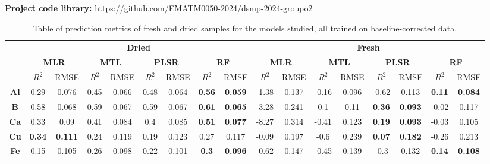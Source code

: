\documentclass[conference]{IEEEtran}
\begin{document}
\vspace{0.1cm}
\noindent \textbf{Project code library:} \url{https://github.com/EMATM0050-2024/dsmp-2024-groupo2}




\clearpage
\onecolumn

\appendix

\begin{table}[htbp]
\caption{Table of prediction metrics of fresh and dried samples for the models studied, all trained on baseline-corrected data.}
\begin{center}

\begin{tabular}{|c|c|c|c|c|c|c|c|c||c|c|c|c|c|c|c|c|}
\cline{2-17}
\multicolumn{1}{c|}{ }& \multicolumn{8}{|c||}{\textbf{Dried}}& \multicolumn{8}{|c|}{\textbf{Fresh}} \\
\cline{2-17}
\multicolumn{1}{c|}{ }& \multicolumn{2}{|c|}{\textbf{MLR}} & \multicolumn{2}{|c|}{\textbf{MTL}} & \multicolumn{2}{|c|}{\textbf{PLSR}} & \multicolumn{2}{|c||}{\textbf{RF}} & \multicolumn{2}{|c|}{\textbf{MLR}} & \multicolumn{2}{|c|}{\textbf{MTL}} & \multicolumn{2}{|c|}{\textbf{PLSR}} & \multicolumn{2}{|c|}{\textbf{RF}}  \\
\cline{2-17}
\multicolumn{1}{c|}{ } & $R^2$ & RMSE & $R^2$ & RMSE & $R^2$ & RMSE & $R^2$ & RMSE & $R^2$ & RMSE & $R^2$ & RMSE & $R^2$ & RMSE & $R^2$ & RMSE \\
\hline
\textbf{Al} & 0.29 & 0.076 & 0.45 & 0.066 & 0.48 & 0.064 & {\color{blue}\textbf{0.56}}& {\color{blue}\textbf{0.059}} & -1.38 & 0.137 & -0.16 & 0.096 & -0.62 & 0.113 & {\color{blue}\textbf{0.11}} & {\color{blue}\textbf{0.084}} \\
\textbf{B} & 0.58 & 0.068 & 0.59 & 0.067 & 0.59 & 0.067 & {\color{blue}\textbf{0.61}}& {\color{blue}\textbf{0.065}} & -3.28 & 0.241 & 0.1 & 0.11 & {\color{blue}\textbf{0.36}} & {\color{blue}\textbf{0.093}} & -0.02 & 0.117 \\
\textbf{Ca} & 0.33 & 0.09 & 0.41 & 0.084 & 0.4 & 0.085 & {\color{blue}\textbf{0.51}}& {\color{blue}\textbf{0.077}} & -8.27 & 0.314 & -0.41 & 0.123 & {\color{blue}\textbf{0.19}} & {\color{blue}\textbf{0.093}} & -0.03 & 0.105 \\
\textbf{Cu} & {\color{blue}\textbf{0.34}}& {\color{blue}\textbf{0.111}}& 0.24 & 0.119 & 0.19 & 0.123 & 0.27 & 0.117 & -0.09 & 0.197 & -0.6 & 0.239 & {\color{blue}\textbf{0.07}} & {\color{blue}\textbf{0.182}} & -0.26 & 0.213 \\
\textbf{Fe} & 0.15 & 0.105 & 0.26 & 0.098 & 0.22 & 0.101 & {\color{blue}\textbf{0.3}}& {\color{blue}\textbf{0.096}} & -0.62 & 0.147 & -0.45 & 0.139 & -0.3 & 0.132 & {\color{blue}\textbf{0.14}} & {\color{blue}\textbf{0.108}} \\

\end{tabular}
\end{center}
\end{table}
\end{document}

